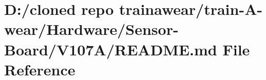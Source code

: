 \hypertarget{_hardware_2_sensor-_board_2_v107_a_2_r_e_a_d_m_e_8md}{}\section{D\+:/cloned repo trainawear/train-\/\+A-\/wear/\+Hardware/\+Sensor-\/\+Board/\+V107\+A/\+R\+E\+A\+D\+ME.md File Reference}
\label{_hardware_2_sensor-_board_2_v107_a_2_r_e_a_d_m_e_8md}
